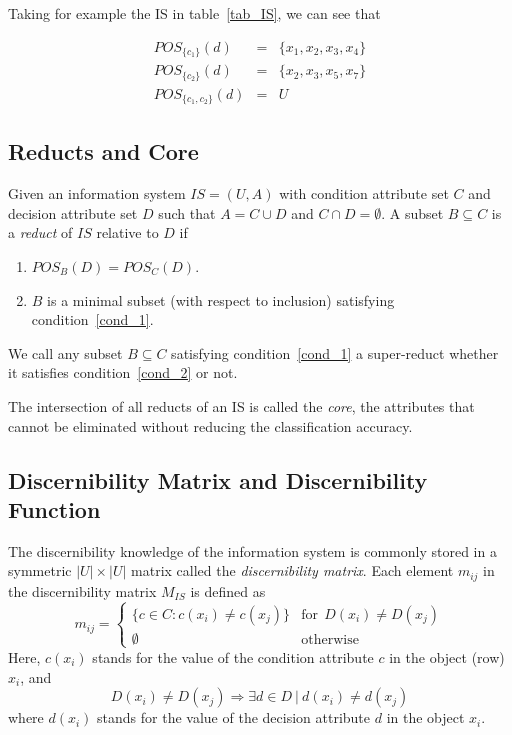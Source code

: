 \documentclass[authoryear,11pt]{elsarticle}
\begin{document}
  Taking for example the IS in table~\ref{tab_IS}, we can see that
  
  $$\begin{array}{lcc}
  POS_{\lbrace c_1 \rbrace}(d)     &=& \lbrace x_1,x_2,x_3,x_4 \rbrace\\
  POS_{\lbrace c_2 \rbrace}(d)     &=& \lbrace x_2,x_3,x_5,x_7 \rbrace\\
  POS_{\lbrace c_1, c_2 \rbrace}(d)&=& U
  \end{array}$$
 
\subsection{Reducts and Core}\label{def_reduct}
  Given an information system $IS=(U,A)$ with condition attribute set $C$ and decision attribute set
  $D$ such that $A=C \cup D$ and $C \cap D =\emptyset$. A subset $B \subseteq C$ is a \textit{reduct} 
  of $IS$ relative to $D$ if
  \begin{enumerate}
  	\item $POS_B(D)=POS_C(D)$. \label{cond_1}
  	\item $B$ is a minimal subset (with respect to inclusion) satisfying condition~\ref{cond_1}.\label{cond_2}
  \end{enumerate}

  We call any subset $B \subseteq C$ satisfying condition~\ref{cond_1} a super-reduct whether it satisfies
  condition~\ref{cond_2} or not.
  
  The intersection of all reducts of an IS is called the \textit{core}, the attributes that cannot be
  eliminated without reducing the classification accuracy.
  
\subsection{Discernibility Matrix and Discernibility Function}
  The discernibility knowledge of the information system is commonly stored in a symmetric $|U| \times |U|$
  matrix called the \textit{discernibility matrix}. Each element $m_{ij}$ in the discernibility matrix 
  $M_{IS}$ is defined as   
  \begin{equation}
  	m_{ij}=\left\lbrace\begin{array}{cl}
  			\lbrace c \in C: c(x_i) \neq c(x_j) \rbrace & \mathrm{for~~}D(x_i) \neq D(x_j)\\
  			\emptyset 								   & \mathrm{otherwise} 
  	\end{array}\right.
  \end{equation}  
  Here, $c(x_i)$ stands for the value of the condition attribute $c$ in the object (row) $x_i$, and 
  $$D(x_i) \neq D(x_j) \Rightarrow \exists d \in D~ |~ d(x_i) \neq d(x_j)$$ 
  where $d(x_i)$ stands for the value  of the decision attribute $d$ in the object $x_i$.
  
\end{document}
